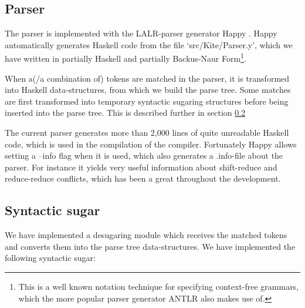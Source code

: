 \subsection{Parser}
The parser is implemented with the LALR-parser generator Happy \cite{marlow01}. Happy automatically generates Haskell code from the file `src/Kite/Parser.y', which we have written in partially Haskell and partially Backus-Naur Form\footnote{This is a well known notation technique for specifying context-free grammars, which the more popular parser generator ANTLR also makes use of.}.

When a(/a combination of) tokens are matched in the parser, it is transformed into Haskell data-structures, from which we build the parse tree. Some matches are first transformed into temporary syntactic sugaring structures before being inserted into the parse tree. This is described further in section \ref{sec:imp-sugar}

The current parser generates more than 2,000 lines of quite unreadable Haskell code, which is used in the compilation of the compiler. Fortunately Happy allows setting a --info flag when it is used, which also generates a .info-file about the parser. For instance it yields very useful information about shift-reduce and reduce-reduce conflicts, which has been a great throughout the development.


\subsection{Syntactic sugar}
\label{sec:imp-sugar}
We have implemented a desugaring module which receives the matched tokens and converts them into the parse tree data-structures. We have implemented the following syntactic sugar:

